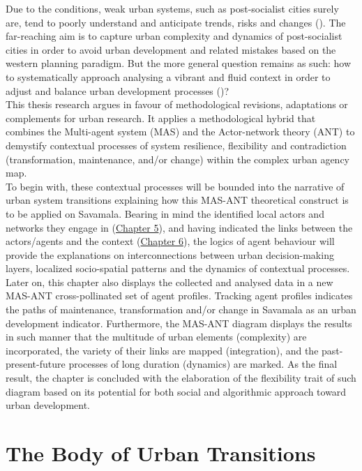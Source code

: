 \documentclass[11pt]{report}
\begin{document}
Due to the conditions, weak urban systems, such as post-socialist cities surely are, tend to poorly understand and anticipate trends, risks and changes (\href{UN}{\cite{UNHabitat2012}}). 
The far-reaching aim is to capture urban complexity and dynamics of post-socialist cities in order to avoid urban development and related mistakes based on the western planning paradigm. 
But the more general question remains as such: how to systematically approach analysing a vibrant and fluid context in order to adjust and balance urban development processes (\href{Bolay}{\cite{BolayAndKern2011}})?
\\

This thesis research argues in favour of methodological revisions, adaptations or complements for urban research. It applies a methodological hybrid that combines the Multi-agent system (MAS) and the Actor-network theory (ANT) to demystify contextual processes of system resilience, flexibility and contradiction (transformation, maintenance, and/or change) within the complex urban agency map.
\\

To begin with, these contextual processes will be bounded into the narrative of urban system transitions explaining how this MAS-ANT theoretical construct is to be applied on Savamala.
Bearing in mind the identified local actors and networks they engage in (\href{Chapter 5}{Chapter 5}), and having indicated the links between the actors/agents and the context (\href{Chapter 6}{Chapter 6}), the logics of agent behaviour will provide the explanations on interconnections between urban decision-making layers, localized socio-spatial patterns and the dynamics of contextual processes.
Later on, this chapter also displays the collected and analysed data in a new MAS-ANT cross-pollinated set of agent profiles.
Tracking agent profiles indicates the paths of maintenance, transformation and/or change in Savamala as an urban development indicator.
Furthermore, the MAS-ANT diagram displays the results in such manner that the multitude of urban elements (complexity) are incorporated, the variety of their links are mapped (integration), and the past-present-future processes of long duration (dynamics) are marked.
As the final result, the chapter is concluded with the elaboration of the flexibility trait of such diagram based on its potential for both social and algorithmic approach toward urban development.

\section{The Body of Urban Transitions}
\end{document}
